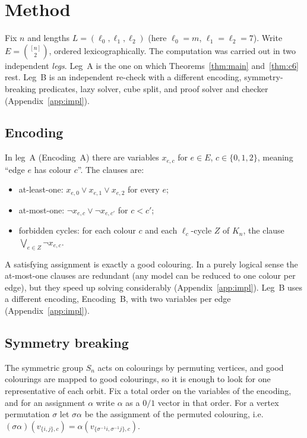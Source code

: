 \documentclass[11pt]{amsart}
\theoremstyle{definition}
\theoremstyle{remark}
\begin{document}
\section{Method}\label{sec:method}

Fix $n$ and lengths $L=(\ell_0,\ell_1,\ell_2)$ (here $\ell_0=m$, $\ell_1=\ell_2=7$). Write $E=\binom{[n]}{2}$, ordered
lexicographically. The computation was carried out in two independent \emph{legs}. Leg~A is the one on which
Theorems~\ref{thm:main} and~\ref{thm:c6} rest. Leg~B is an independent re-check with a different encoding, symmetry-breaking predicates, lazy solver, cube split, and proof
solver and checker (Appendix~\ref{app:impl}).

\subsection{Encoding}
In leg~A (Encoding~A) there are variables $x_{e,c}$ for $e\in E$, $c\in\{0,1,2\}$, meaning ``edge $e$ has colour $c$''. The clauses are:
\begin{itemize}
\item at-least-one: $x_{e,0}\vee x_{e,1}\vee x_{e,2}$ for every $e$;
\item at-most-one: $\neg x_{e,c}\vee\neg x_{e,c'}$ for $c<c'$;
\item forbidden cycles: for each colour $c$ and each $\ell_c$-cycle $Z$ of $K_n$, the clause $\bigvee_{e\in Z}\neg x_{e,c}$.
\end{itemize}
A satisfying assignment is exactly a good colouring. In a purely logical sense the at-most-one clauses are redundant (any model can
be reduced to one colour per edge), but they speed up solving considerably (Appendix~\ref{app:impl}). Leg~B uses a different
encoding, Encoding~B, with two variables per edge (Appendix~\ref{app:impl}).

\subsection{Symmetry breaking}\label{sec:sb}
The symmetric group $S_n$ acts on colourings by permuting vertices, and good colourings are mapped to good colourings, so it is enough
to look for one representative of each orbit. Fix a total order on the variables of the encoding, and for an assignment $\alpha$ write
$\alpha$ as a $0/1$ vector in that order. For a vertex permutation $\sigma$ let $\sigma\alpha$ be the assignment of the permuted
colouring, i.e.\ $(\sigma\alpha)(v_{\{i,j\},c})= \alpha(v_{\{\sigma^{-1}i,\sigma^{-1}j\},c})$.
\end{document}
